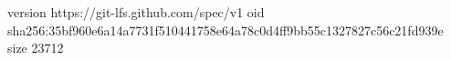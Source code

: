 version https://git-lfs.github.com/spec/v1
oid sha256:35bf960e6a14a7731f510441758e64a78c0d4ff9bb55c1327827c56c21fd939e
size 23712
